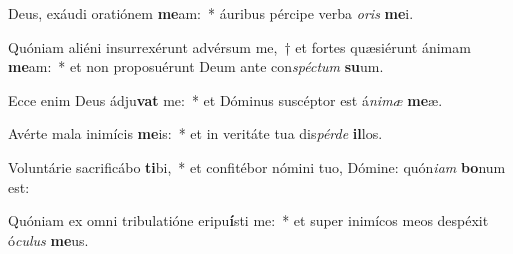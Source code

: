 \item Deus, exáudi oratiónem \textbf{me}am:~* áuribus pércipe verba \textit{oris} \textbf{me}i.
\item Quóniam aliéni insurrexérunt advérsum me,~† et fortes quæsiérunt ánimam \textbf{me}am:~* et non proposuérunt Deum ante con\tinyhspace\textit{spéctum} \textbf{su}um.
\item Ecce enim Deus ádju\textbf{vat} me:~* et Dóminus suscéptor est á\textit{nimæ} \textbf{me}æ.
\item Avérte mala inimícis \textbf{me}is:~* et in veritáte tua dis\textit{pérde} \textbf{il}los.
\item Voluntárie sacrificábo \textbf{ti}bi,~* et confitébor nómini tuo, Dómine: quón\textit{iam} \textbf{bo}num est:
\item Quóniam ex omni tribulatióne eripu\textbf{í}sti me:~* et super inimícos meos despéxit ó\textit{culus} \textbf{me}us.
